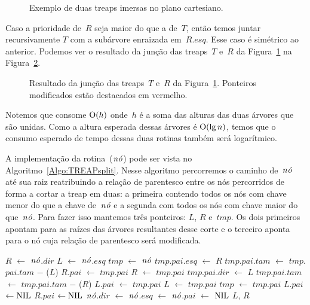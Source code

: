 \begin{figure}[htb]
\centering

\caption{Exemplo de duas treaps imersas no plano cartesiano.}
\label{fig:treap-join}
\end{figure}


Caso a prioridade de~$R$ seja maior do que a de~$T$, então temos juntar recursivamente $T$ com a subárvore enraizada em~$R$.$esq$. Esse caso é simétrico ao anterior.
Podemos ver o resultado da junção das treaps~$T$ e~$R$ da Figura~\ref{fig:treap-join} na Figura~\ref{fig:treap-join-depois}.




\begin{figure}[htb]
\centering

\caption{Resultado da junção das treaps~$T$ e~$R$ da Figura~\ref{fig:treap-join}. Ponteiros modificados estão destacados em vermelho.}
\label{fig:treap-join-depois}
\end{figure}
Notemos que \treapJoin{} consome $\mathrm{O}(h)$ onde~$h$ é a soma das alturas das duas árvores que são unidas.
Como a altura esperada dessas árvores é $\mathrm{O}(\lg n)$, temos que o consumo esperado de tempo dessas duas rotinas também será logarítmico.


A implementação da rotina~\treapSplit($\node$) pode ser vista no Algoritmo~\ref{Algo:TREAPsplit}.
Nesse algoritmo percorremos o caminho de~$\node$ até sua raiz reatribuindo a relação de parentesco entre os nós percorridos de forma a cortar a treap em duas:
a primeira contendo todos os nós com chave menor do que a chave de~$\node$ e a segunda com todos os nós com chave maior do que~$\node$.
Para fazer isso mantemos três ponteiros: $L$, $R$ e~$tmp$. 
Os dois primeiros apontam para as raízes das árvores resultantes desse corte e o terceiro aponta para o nó cuja relação de parentesco será modificada.

\begin{algorithm}
\caption{\treapSplit($\node$)}
\label{Algo:TREAPsplit}
\begin{algorithmic}[1]
\State $R$ $\gets $ $\node$.$dir$
\State $L$ $\gets $ $\node$.$esq$
\State $tmp$ $\gets$ $\node$
    \State $tmp$.$pai$.$esq$ $\gets$ $R$
    \State $tmp$.$pai$.$tam$ $\gets$ $tmp$.$pai$.$tam$ $\mathit{-}$ \treapGetSize($L$)
    \State $R$.$pai$ $\gets$ $tmp$.$pai$
    \EndIf
    \State $R$ $\gets$ $tmp$.$pai$
  \Else
    \State $tmp$.$pai$.$dir$ $\gets$ $L$ 
    \State $tmp$.$pai$.$tam$ $\gets$ $tmp$.$pai$.$tam$ $\mathit{-}$ \treapGetSize($R$)
    \State $L$.$pai$ $\gets$ $tmp$.$pai$
    \EndIf
    \State $L$ $\gets$ $tmp$.$pai$
  \EndIf
  \State $tmp$ $\gets$ $tmp$.$pai$
\EndWhile
{} $L$.$pai$ $\gets\text{NIL}$\EndIf
{} $R$.$pai$ $\gets\text{NIL}$\EndIf
\State $\node$.$dir$ $\gets $ $\node$.$esq$ $\gets$ $\node$.$pai$ $\gets$ $\text{NIL}$
\State\Return $L$, $R$
\end{algorithmic}
\end{algorithm}


